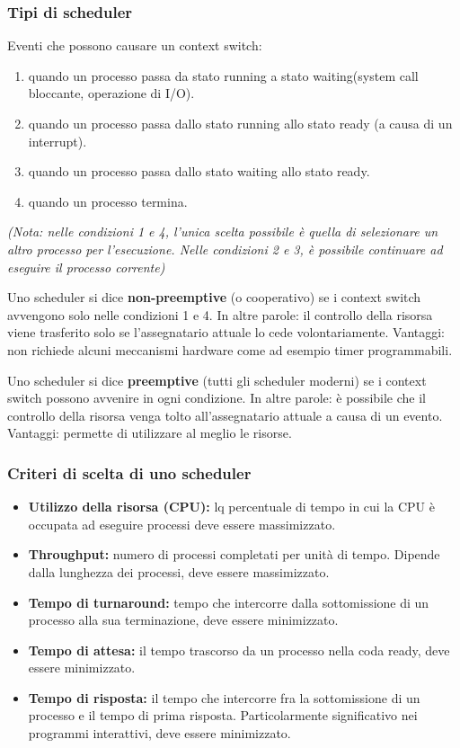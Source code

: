 \subsubsection{Tipi di scheduler}
Eventi che possono causare un context switch:
\begin{enumerate}
    \item quando un processo passa da stato running a stato waiting(system call bloccante, operazione di I/O).
    \item quando un processo passa dallo stato running allo stato ready (a causa di un interrupt).
    \item quando un processo passa dallo stato waiting allo stato ready.
    \item quando un processo termina.
\end{enumerate}

\textit{(Nota: nelle condizioni 1 e 4, l'unica scelta possibile è quella di selezionare un altro processo per l'esecuzione. Nelle condizioni 2 e 3, è possibile continuare ad eseguire il processo corrente)}
\newline

Uno scheduler si dice \textbf{non-preemptive} (o cooperativo) se i context switch avvengono solo nelle condizioni 1 e 4. In altre parole: il controllo della risorsa viene trasferito solo se l'assegnatario attuale lo cede volontariamente.
Vantaggi: non richiede alcuni meccanismi hardware come ad esempio timer programmabili.

Uno scheduler si dice \textbf{preemptive} (tutti gli scheduler moderni) se i context switch possono avvenire in ogni condizione. In altre parole: è possibile che il controllo della risorsa venga tolto all'assegnatario attuale a causa di un evento. 
Vantaggi: permette di utilizzare al meglio le risorse.
\newpage
\subsubsection{Criteri di scelta di uno scheduler}
\begin{itemize}
    \item \textbf{Utilizzo della risorsa (CPU):} lq percentuale di tempo in cui la CPU è occupata ad eseguire processi deve essere massimizzato.
    \item \textbf{Throughput:} numero di processi completati per unità di tempo. Dipende dalla lunghezza dei processi, deve essere massimizzato.
    \item \textbf{Tempo di turnaround:} tempo che intercorre dalla sottomissione di un processo alla sua terminazione, deve essere minimizzato.
    \item \textbf{Tempo di attesa:} il tempo trascorso da un processo nella coda ready, deve essere minimizzato.
    \item \textbf{Tempo di risposta:} il tempo che intercorre fra la sottomissione di un processo e il tempo di prima risposta. Particolarmente significativo nei programmi interattivi, deve essere minimizzato.
\end{itemize}

